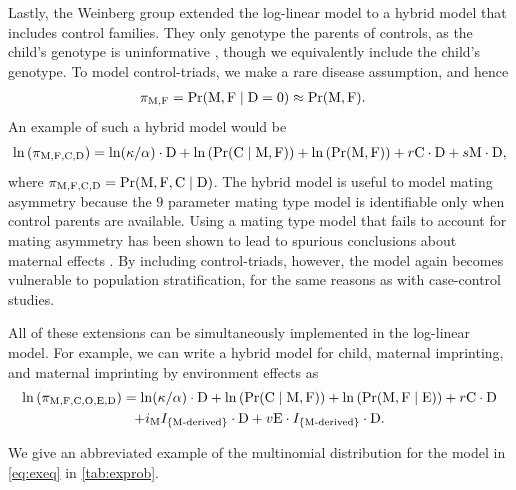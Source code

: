 Lastly, the Weinberg group \cite{WeinUmba05} extended the log-linear model to a hybrid model that includes control families.
They only genotype the parents of controls, as the child's genotype is uninformative \cite{WeinUmba05, Ains+11, HoweCord12}, though we equivalently include the child's genotype.
To model control-triads, we make a rare disease assumption, and hence
\begin{align*}
    \pi_{{\rm M}, {\rm F}} &= \Pr({\rm M}, {\rm F} \mid {\rm D} = 0) \approx \Pr({\rm M}, {\rm F}).
\end{align*}
An example of such a hybrid model would be
\begin{equation*}
    \ln\left(\pi_{{\rm M}, {\rm F}, {\rm C}, {\rm D}}\right) = \ln(\kappa/\alpha) \cdot {\rm D} + \ln\left(\Pr({\rm C} \mid {\rm M}, {\rm F})\right) + \ln\left(\Pr({\rm M}, {\rm F})\right) + r {\rm C} \cdot {\rm D} + s {\rm M} \cdot {\rm D},
\end{equation*}
where $\pi_{{\rm M}, {\rm F}, {\rm C}, {\rm D}} = \Pr({\rm M}, {\rm F}, {\rm C} \mid {\rm D})$.
The hybrid model is useful to model mating asymmetry \cite{WeinUmba05} because the $9$ parameter mating type model is identifiable only when control parents are available.
Using a mating type model that fails to account for mating asymmetry has been shown to lead to spurious conclusions about maternal effects \cite{Heal+10}.
By including control-triads, however, the model again becomes vulnerable to population stratification, for the same reasons as with case-control studies.

All of these extensions can be simultaneously implemented in the log-linear model.
For example, we can write a hybrid model for child, maternal imprinting, and maternal imprinting by environment effects as
\begin{multline}\label{eq:exeq}
    \ln\left(\pi_{{\rm M}, {\rm F}, {\rm C}, {\rm O}, {\rm E}, {\rm D}}\right) = \ln(\kappa/\alpha) \cdot {\rm D} + \ln\left(\Pr({\rm C} \mid {\rm M}, {\rm F})\right) + \ln\left(\Pr({\rm M}, {\rm F} \mid {\rm E})\right) + r {\rm C} \cdot {\rm D} \\
    + i_{{\rm M}} I_{\text{\{M-derived\}}} \cdot {\rm D} + v {\rm E} \cdot I_{\text{\{M-derived\}}} \cdot {\rm D}.
\end{multline}

We give an abbreviated example of the multinomial distribution for the model in \cref{eq:exeq} in \cref{tab:exprob}.

